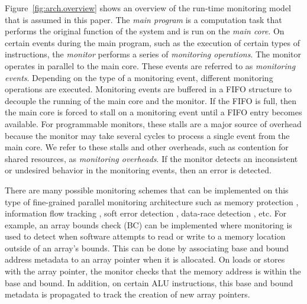 Figure~\ref{fig:arch.overview} shows an overview of the run-time monitoring
model that is assumed in this paper.  The \emph{main program} is a computation
task that performs the original function of the system and is run on the
\emph{main core}.  On certain events during the main program, such as the
execution of certain types of instructions, the \emph{monitor} performs a
series of \emph{monitoring operations}. The monitor operates in parallel to the
main core. These events are referred to as \emph{monitoring events}. Depending
on the type of a monitoring event, different monitoring operations are
executed. Monitoring events are buffered in a FIFO structure to decouple the
running of the main core and the monitor. If the FIFO is full, then the main
core is forced to stall on a monitoring event until a FIFO entry becomes
available. For programmable monitors, these stalls are a major source of
overhead because the monitor may take several cycles to process a single event
from the main core. We refer to these stalls and other overheads, such as
contention for shared resources, as \emph{monitoring overheads}. If the monitor
detects an inconsistent or undesired behavior in the monitoring events, then
an error is detected. 

There are many possible monitoring schemes that can be implemented on this type
of fine-grained parallel monitoring architecture such as memory protection
\cite{mondrian-asplos02}, information flow tracking \cite{dift-asplos04,
testudo-micro08}, soft error detection \cite{argus-micro07}, data-race
detection \cite{cord-hpca06}, etc.  For example, an array bounds check (BC)
\cite{hardbound-asplos08} can be implemented where monitoring is used to detect
when software attempts to read or write to a memory location outside of an
array's bounds. This can be done by associating base and bound address metadata
to an array pointer when it is allocated. On loads or stores with the array
pointer, the monitor checks that the memory address is within the base and
bound. In addition, on certain ALU instructions, this base and bound metadata
is propagated to track the creation of new array pointers.

